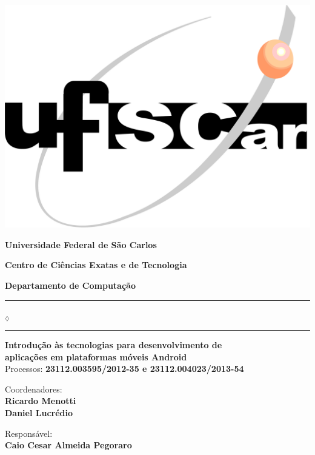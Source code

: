 
\begin{center}

\begin{minipage}[c]{\textwidth}
  \parbox[c]{3cm}{
      \begin{flushright}
      \includegraphics[width=.25\textwidth]{../figuras/LogoUfscar}
      \end{flushright}
  }
  \parbox[c]{12cm}
    {
      \begin{center}
      \textbf{\Large Universidade Federal de São Carlos}

      \vspace{0.07cm}

      \textbf{\large Centro de Ciências Exatas e de Tecnologia}

      \vspace{0.07cm}

      \textbf{\large Departamento de Computação}
      \vspace{0.07cm}
      \end{center}
    }
\end{minipage}

\vspace{-0.5cm}
\rule{7.5cm}{0.03pc}{\tiny $_\diamondsuit$}\rule{7.5cm}{0.03pc}

\vspace*{20ex}

\textbf{\Large {Introdução às tecnologias para desenvolvimento de \\ aplicações em plataformas móveis Android}} \\
\large{ Processos: \textbf{23112.003595/2012-35 e 23112.004023/2013-54}}

\vspace*{5ex}

{\Large{ Coordenadores:  }} \\
\textbf{\Large{ Ricardo Menotti}} \\
\textbf{\Large{ Daniel Lucrédio}}

\vspace*{5ex}

{\Large{ Responsável:  }}  \\
\textbf{\Large{ Caio Cesar Almeida Pegoraro }}  \\


\end{center}
